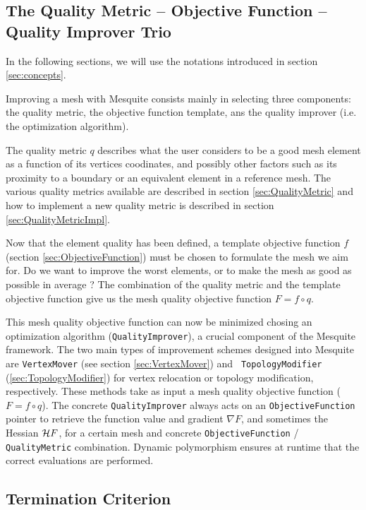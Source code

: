 \subsection{The Quality Metric -- Objective Function -- Quality Improver Trio} 
\label{sec:trio}

In the following sections, we will use the notations introduced in section \ref{sec:concepts}. 

Improving a mesh with Mesquite consists mainly in selecting three components: the quality metric,
the objective function template, ans the quality improver (i.e. the optimization algorithm). 

The quality metric $q$ describes what the user considers to be a good mesh element as a function of
its vertices coodinates, and possibly other factors such as its proximity to a boundary or an
equivalent element in a reference mesh. The various quality metrics available are described in
section \ref{sec:QualityMetric} and how to implement a new quality metric is described in section
\ref{sec:QualityMetricImpl}.

Now that the element quality has been defined, a template objective function $f$ (section
\ref{sec:ObjectiveFunction}) must be chosen to formulate the mesh we aim for. Do we want to improve
the worst elements, or to make the mesh as good as possible in average ? The combination of the
quality metric and the template objective function give us the mesh quality objective function $F=f
\circ q$.

This mesh quality objective function can now be minimized chosing an optimization algorithm
(\texttt{QualityImprover}), 
a crucial component of the Mesquite framework.  The two main types of improvement schemes
designed into Mesquite are {\tt VertexMover} (see section \ref{sec:VertexMover}) and {\tt
TopologyModifier} (\ref{sec:TopologyModifier}) for vertex relocation or topology modification,
respectively.  These methods take as input a mesh quality objective function ($F=f \circ q$).
The concrete \texttt{QualityImprover} always acts on an
\texttt{ObjectiveFunction} pointer to retrieve the function value and
gradient $\nabla F$, and sometimes the Hessian ${\cal H} F$, for a certain mesh and concrete \texttt{ObjectiveFunction} /
\texttt{QualityMetric} combination.  Dynamic polymorphism ensures at
runtime that the correct evaluations are performed.


\subsection{Termination Criterion}
\label{termination_section}

